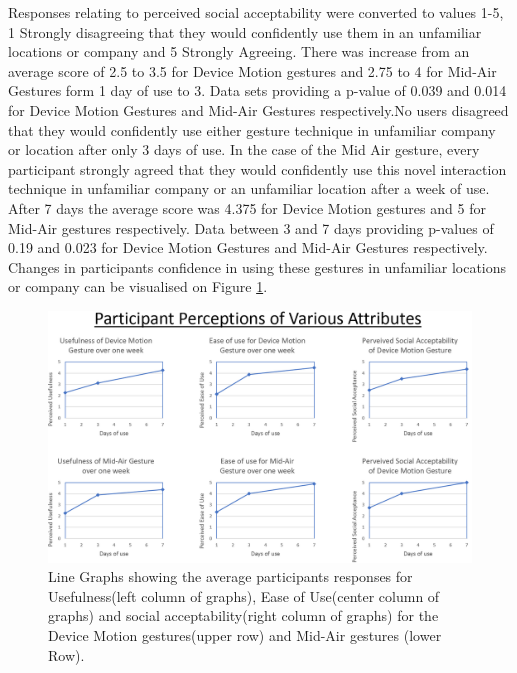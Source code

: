 \documentclass{l4proj}
\begin{document}
Responses relating to perceived social acceptability were converted to values 1-5, 1 Strongly disagreeing that they would confidently use them in an unfamiliar locations or company and 5 Strongly Agreeing. There was increase from an average score of 2.5 to 3.5 for Device Motion gestures and 2.75 to 4 for Mid-Air Gestures form 1 day of use to 3. Data sets providing a p-value of 0.039 and 0.014 for Device Motion Gestures and Mid-Air Gestures respectively.No users disagreed that they would confidently use either gesture technique in unfamiliar company or location after only 3 days of use.  In the case of the Mid Air gesture, every participant strongly agreed that they would confidently use this novel interaction technique in unfamiliar company or an unfamiliar location after a week of use. After 7 days the average score was 4.375 for Device Motion gestures and 5 for Mid-Air gestures respectively. Data between 3 and 7 days providing p-values of 0.19 and 0.023 for Device Motion Gestures and Mid-Air Gestures respectively. Changes in participants confidence in using these gestures in unfamiliar locations or company can be visualised on Figure \ref{fig:perceptions}.


\begin{figure}[!htb]
    \centering
    \includegraphics[width=\textwidth]{images/perceptions.PNG}
        \caption{Line Graphs showing the average participants responses for Usefulness(left column of graphs), Ease of Use(center column of graphs) and social acceptability(right column of graphs) for the Device Motion gestures(upper row) and Mid-Air gestures (lower Row).}
        \label{fig:perceptions}
\end{figure}
\end{document}
